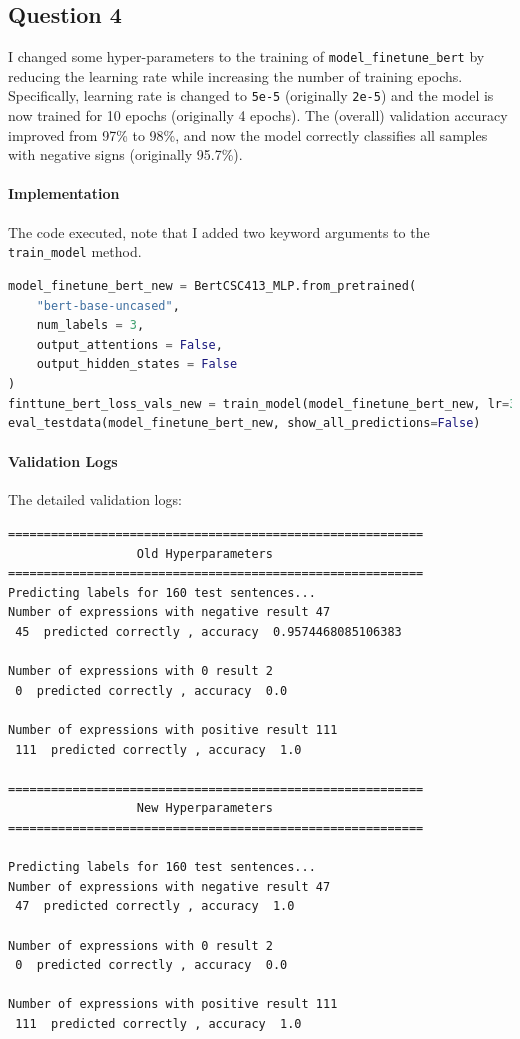 \documentclass{article}
\begin{document}
\subsection{Question 4}
\par I changed some hyper-parameters to the training of \texttt{model\_finetune\_bert} by reducing the learning rate while increasing the number of training epochs. Specifically, learning rate is changed to \texttt{5e-5} (originally \texttt{2e-5}) and the model is now trained for 10 epochs (originally 4 epochs). The (overall) validation accuracy improved from 97\% to 98\%, and now the model correctly classifies all samples with negative signs (originally 95.7\%).

\paragraph{Implementation} The code executed, note that I added two keyword arguments to the \texttt{train\_model} method.
\begin{lstlisting}[language=Python]
model_finetune_bert_new = BertCSC413_MLP.from_pretrained(
    "bert-base-uncased", 
    num_labels = 3,    
    output_attentions = False, 
    output_hidden_states = False
)
finttune_bert_loss_vals_new = train_model(model_finetune_bert_new, lr=3e-5, epochs=10)
eval_testdata(model_finetune_bert_new, show_all_predictions=False)
\end{lstlisting}

\paragraph{Validation Logs} The detailed validation logs:
\begin{lstlisting}
==========================================================
				  Old Hyperparameters
==========================================================
Predicting labels for 160 test sentences...
Number of expressions with negative result 47 
 45  predicted correctly , accuracy  0.9574468085106383 

Number of expressions with 0 result 2 
 0  predicted correctly , accuracy  0.0 

Number of expressions with positive result 111 
 111  predicted correctly , accuracy  1.0 

==========================================================
				  New Hyperparameters
==========================================================

Predicting labels for 160 test sentences...
Number of expressions with negative result 47 
 47  predicted correctly , accuracy  1.0 

Number of expressions with 0 result 2 
 0  predicted correctly , accuracy  0.0 

Number of expressions with positive result 111 
 111  predicted correctly , accuracy  1.0 
\end{lstlisting}
\end{document}

